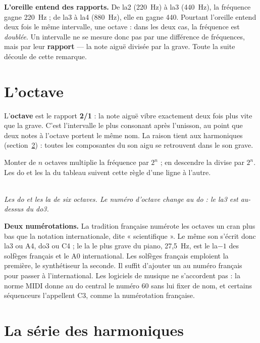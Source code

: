 \documentclass[a4paper,11pt]{article}
\newcommand{\legende}[1]{\\[4pt]{\small\itshape\color{mygray} #1}}
\begin{document}
\textbf{L'oreille entend des rapports.} De la2 (220~Hz) à la3 (440~Hz), la
fréquence gagne 220~Hz ; de la3 à la4 (880~Hz), elle en gagne 440. Pourtant
l'oreille entend deux fois le même intervalle, une octave : dans les deux cas,
la fréquence est \emph{doublée}. Un intervalle ne se mesure donc pas par une
différence de fréquences, mais par leur \textbf{rapport} --- la note aiguë
divisée par la grave. Toute la suite découle de cette remarque.

\section{L'octave}
\label{sec:octave}

L'\textbf{octave} est le rapport \textbf{2/1} : la note aiguë vibre exactement
deux fois plus vite que la grave. C'est l'intervalle le plus consonant après
l'unisson, au point que deux notes à l'octave portent le même nom. La raison
tient aux harmoniques (section~\ref{sec:harmoniques}) : toutes les
composantes du son aigu se retrouvent dans le son grave.

Monter de $n$ octaves multiplie la fréquence par $2^n$ ; en descendre la divise
par $2^n$. Les do et les la du tableau suivent cette règle d'une ligne à
l'autre.

\begin{center}

\legende{Les do et les la de six octaves. Le numéro d'octave change au do : le
la3 est au-dessus du do3.}
\end{center}

\begin{remarque}
\textbf{Deux numérotations.} La tradition française numérote les octaves un
cran plus bas que la notation internationale, dite « scientifique ». Le même
son s'écrit donc la3 ou A4, do3 ou C4 ; le la le plus grave du piano, 27,5~Hz,
est le la$-1$ des solfèges français et le A0 international. Les solfèges
français emploient la première, le synthétiseur la seconde. Il suffit
d'ajouter un au numéro français pour passer à l'international. Les logiciels
de musique ne s'accordent pas : la norme MIDI donne au do central le numéro 60
sans lui fixer de nom, et certains séquenceurs l'appellent C3, comme la
numérotation française.
\end{remarque}

\section{La série des harmoniques}
\label{sec:harmoniques}
\end{document}
